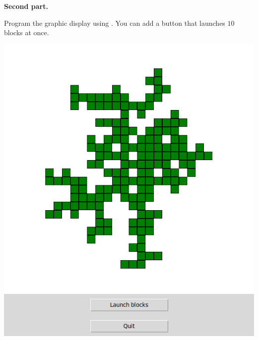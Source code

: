 \documentclass[11pt,class=report,crop=false]{standalone}
\begin{document}
\begin{activite}
\textbf{Second part.}

Program the graphic display using . You can add a button that launches $10$ blocks at once.

\begin{center}
\includegraphics[scale=\myscale,scale=0.30]{screen-blocks-tree2-en}
\end{center}

\end{activite}


\end{document}
